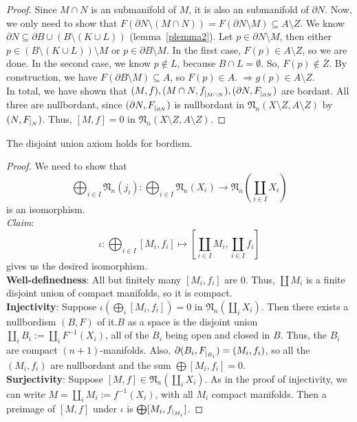 \documentclass[a4paper,11pt]{article}
\begin{document}
\begin{proof}
    Since \(M\cap N\) is an submanifold of \(M\), it is also an submanifold of \(\partial N\). 
    Now, we only need to show that \(F(\partial N\setminus(M\cap N))=F(\partial N\setminus M)\subseteq A\setminus Z\). 
    We know \(\partial N\subseteq\partial B\cup(B\setminus(K\cup L))\) (lemma\ \ref{plemma2}). 
    Let \(p\in\partial N\setminus M\), then either \(p\in(B\setminus(K\cup L))\setminus M\) or \(p\in\partial B\setminus M\). In the first case, \(F(p)\in A\setminus Z\), so we are done. 
    In the second case, we know \(p\notin L\), because \(B\cap L=\emptyset\). So, \(F(p)\notin\overline{Z}\). By construction, we have \(F(\partial B\setminus M)\subseteq A\), so \(F(p)\in A\). \(\Rightarrow g(p)\in A\setminus Z\).\\
    In total, we have shown that \((M,f), (M\cap N,f_{|_{M\cap N}}), (\partial N,F_{|_{\partial N}})\) are bordant. All three are nullbordant, since \((\partial N,F_{|_{\partial N}})\) is nullbordant in \(\mathfrak{N}_n(X\setminus Z,A\setminus Z)\) by \((N,F_{|_{N}})\). Thus, \([M,f]=0\) in \(\mathfrak N_n(X\setminus Z,A\setminus Z)\).
\end{proof}


\begin{lemma}\label{disjoint union}
    The disjoint union axiom holds for bordism.
\end{lemma}

\begin{proof}\cite{zhang}
    We need to show that 
    \[\bigoplus_{i\in I}\mathfrak{N}_n(j_i):\bigoplus_{i\in I}\mathfrak{N}_n(X_i)\to\mathfrak{N}_n\left(\coprod_{i\in I}X_i\right)\] 
    is an isomorphism.\\
    \textit{Claim}: \[\iota:\bigoplus_{i\in I}[M_i,f_i]\mapsto \left[\coprod_{i\in I}M_i,\coprod_{i\in I} f_i\right]\]
    gives us the desired isomorphism.\\
    \textbf{Well-definedness}: All but finitely many \([M_i,f_i]\) are \(0\). Thus, \(\coprod M_i\) is a finite disjoint union of compact manifolds, so it is compact.\\
    \textbf{Injectivity}: Suppose \(\iota\left(\bigoplus_i[M_i,f_i]\right)=0\) in \(\mathfrak{N}_n(\coprod_i X_i)\). 
    Then there exists a nullbordism \((B,F)\) of it.\(B\) as a space is the disjoint union \(\coprod_i B_i:=\coprod_i F^{-1}(X_i)\), all of the \(B_i\) being open and closed in \(B\). 
    Thus, the \(B_i\) are compact \((n+1)\)-manifolds. Also, \(\partial(B_i,F_{|_{B_i}})=(M_i,f_i)\), so all the \((M_i,f_i)\) are nullbordant and the sum \(\bigoplus[M_i,f_i]=0\).
    \\
    \textbf{Surjectivity}: Suppose \([M,f]\in\mathfrak{N}_n(\coprod_i X_i)\). As in the proof of injectivity, we can write \(M=\coprod_i M_i:=f^{-1}(X_i)\), with all \(M_i\) compact manifolds. Then a preimage of \([M,f]\) under \(\iota\) is \(\bigoplus[M_i,f_{|_{M_i}}]\).
\end{proof}
\end{document}
